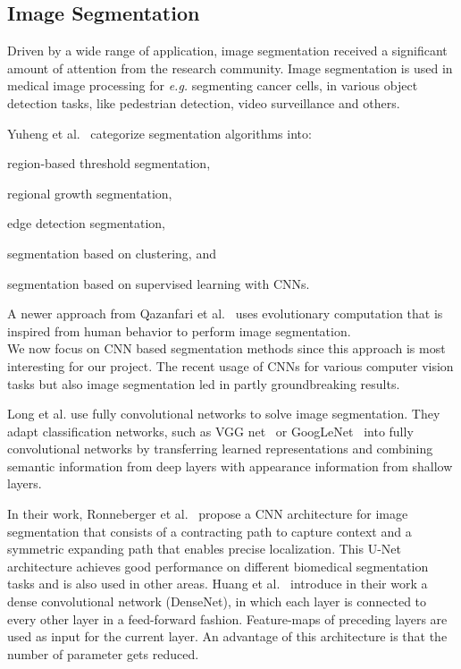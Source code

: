 \subsection{Image Segmentation}
\label{ssec:num21}

Driven by a wide range of application, image segmentation received a significant amount of attention from the research community. Image segmentation is used in medical image processing for \textit{e.g.} segmenting cancer cells, in various object detection tasks, like pedestrian detection, video surveillance and others. 

Yuheng et al.~\cite{Yuheng17} categorize segmentation algorithms into: \begin{enumerate*}[label=(\roman*)] \item region-based threshold segmentation, \item regional growth segmentation, \item edge detection segmentation, \item segmentation based on clustering, and \item segmentation based on supervised learning with CNNs.\end{enumerate*} A newer approach from Qazanfari et al.~\cite{Qazanfari17} uses evolutionary computation that is inspired from human behavior to perform image segmentation.\\

We now focus on CNN based segmentation methods since this approach is most interesting for our project.  The recent usage of CNNs for various computer vision tasks but also image segmentation led in partly groundbreaking results. 

Long et al.\cite{long15} use fully convolutional networks to solve image segmentation. They adapt classification networks, such as VGG net~\cite{Simonyan14} or GoogLeNet~\cite{Szegedy15} into fully convolutional networks by transferring learned representations and combining semantic information from deep layers with appearance information from shallow layers.

In their work, Ronneberger et al.~\cite{Ronneberger15} propose a CNN architecture for image segmentation that consists of a contracting path to capture context and a symmetric expanding path that enables precise localization. This U-Net architecture achieves good performance on different biomedical segmentation tasks and is also used in other areas.
Huang et al.~\cite{Huang16} introduce in their work a dense convolutional network (DenseNet), in which each layer is connected to every other layer in a feed-forward fashion. Feature-maps of preceding layers are used as input for the current layer. An advantage of this architecture is that the number of parameter gets reduced.

